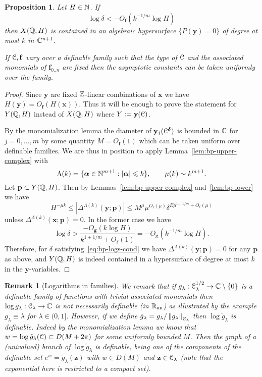 \documentclass[reqno]{amsart}
\newtheorem{Prop}[Cor]{Proposition}{\bfseries}{\itshape}
\newtheorem{Rem}[Cor]{Remark}{\scshape}{\rmfamily}
\renewcommand\~[1]{\widetilde{#1}}
\def\vf{{\mathbf f}}
\def\vg{{\mathbf g}}
\def\vx{{\mathbf x}}
\def\vz{{\mathbf z}}
\def\vy{{\mathbf y}}
\def\vp{{\mathbf p}}
\def\valpha{{\boldsymbol\alpha}}
\def\vdelta{{\boldsymbol\delta}}
\def\an{{\text{an}}}
\begin{document}
\begin{Prop}\label{prop:bp-logs}
  Let $H\in{\mathbb N}$. If
  \begin{equation}\label{eq:bp-logs-cond}
    \log\delta < -O_\vf(k^{-1/m}\log H)
  \end{equation}
  then $X({\mathbb Q},H)$ is contained in an algebraic hypersurface
  $\{P(\vy)=0\}$ of degree at most $k$ in ${\mathbb C}^{n+1}$.

  If $\cC,\vf$ vary over a definable family such that the type of
  ${\mathcal C}$ and the associated monomials of $\vf_{0..n}$ are fixed then
  the asymptotic constants can be taken uniformly over the family.
\end{Prop}
\begin{proof}
  Since $\vy$ are fixed ${\mathbb Z}$-linear combinations of $\vx$ we have
  $H(\vy)=O_\vf(H(\vx))$. Thus it will be enough to prove the
  statement for $Y({\mathbb Q},H)$ instead of $X({\mathbb Q},H)$ where $Y:=\vy(\cC)$.
  
  By the monomialization lemma the diameter of $\vy_j(\cC^\vdelta)$ is
  bounded in ${\mathbb C}$ for $j=0,\ldots,m$ by some quantity $M=O_\vf(1)$
  which can be taken uniform over definable families. We are thus in
  position to apply Lemma~\ref{lem:bp-upper-complex} with
  \begin{equation}
    \Lambda(k)=\{\valpha\in\N^{m+1}:|\valpha|\le k\}, \qquad \mu(k)\sim k^{m+1}.
  \end{equation}
  Let $\vp\subset Y(\Q,H)$. Then by Lemmas~\ref{lem:bp-upper-complex}
  and~\ref{lem:bp-lower} we have
  \begin{equation}
     H^{-\mu k} \le |\Delta^{\Lambda(k)}(\vy;\vp)| \le M^\mu \mu^{O_\ell(\mu)} \delta^{E\mu^{1+1/m}+O_\ell(\mu)}
  \end{equation}
  unless $\Delta^{\Lambda(k)}(\vx;\vp)=0$. In the former case we have
  \begin{equation}
    \log\delta > \frac{-O_\vg(k\log H)}{k^{1+1/m}+O_\ell(1)}=-O_\vg(k^{-1/m}\log H).
  \end{equation}
  Therefore, for $\delta$ satisfying~\eqref{eq:bp-logs-cond} we have
  $\Delta^{\Lambda(k)}(\vy;\vp)=0$ for any $\vp$ as above, and
  $Y({\mathbb Q},H)$ is indeed contained in a hypersurface of degree at most
  $k$ in the $\vy$-variables.
\end{proof}


\begin{Rem}[Logarithms in families]\label{rem:logs-in-family}
  We remark that if $g_\lambda:{\mathcal C}_\lambda^{1/2}\to{\mathbb C}\setminus\{0\}$
  is a definable family of functions with trivial associated monomials
  then $\log g_\lambda:{\mathcal C}_\lambda\to{\mathbb C}$ is not necessarily definable
  (in $\R_\an$) as illustrated by the example $g_\lambda\equiv\lambda$
  for $\lambda\in(0,1]$. However, if we define
  $\tilde g_\lambda=g_\lambda/\left\Vert g_\lambda \right\Vert_{{\mathcal C}_\lambda}$ then
  $\log\tilde g_\lambda$ is definable. Indeed by the monomialization
  lemma we know that $w=\log \tilde g_\lambda({\mathcal C})\subset D(M+2\pi)$
  for some uniformly bounded $M$. Then the graph of a (univalued)
  branch of $\log\tilde g_\lambda$ is definable, being one of the
  components of the definable set $e^w=\tilde g_\lambda(\vz)$ with
  $w\in D(M)$ and $\vz\in\cC_\lambda$ (note that the exponential here
  is \emph{restricted} to a compact set).
\end{Rem}
\end{document}

